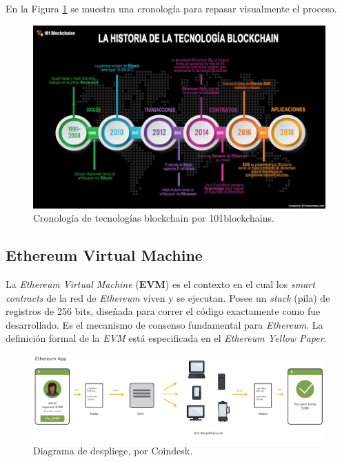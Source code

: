 En la Figura \ref{fig:blockchain history} se muestra una cronología para repasar visualmente el proceso.

\begin{figure}[ht]
    \centering
    \includegraphics[scale=0.3]{images/historiablockchain.jpg}
    \caption{ Cronología de tecnologías blockchain por 101blockchains.}
    \label{fig:blockchain history}
\end{figure}

\subsection{Ethereum Virtual Machine}
La \textit{Ethereum Virtual Machine} (\textbf{EVM}) es el contexto en el cual los \textit{smart contracts} de la red de \textit{Ethereum} viven y se ejecutan. Posee un \textit{stack} (pila) de registros de 256 bits, diseñada para correr el código exactamente como fue desarrollado. Es el mecanismo de consenso fundamental para \textit{Ethereum}. La definición formal de la \textit{EVM} está especificada en el \textit{Ethereum Yellow Paper}.

\begin{figure}[ht]
    \centering
    \includegraphics[scale=0.5]{images/ethflowapp.png}
    \caption{Diagrama de despliege, por Coindesk.}
    \label{fig:ethereum app}
\end{figure}

